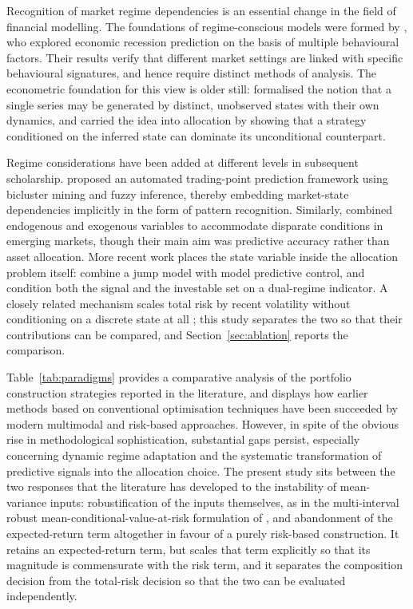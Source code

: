 \documentclass{singlecol-new}
\theoremstyle{TH}{
\newtheorem{lemma}{Lemma}
\newtheorem{theorem}[lemma]{Theorem}
\newtheorem{corrolary}[lemma]{Corrolary}
\newtheorem{conjecture}[lemma]{Conjecture}
\newtheorem{proposition}[lemma]{Proposition}
\newtheorem{claim}[lemma]{Claim}
\newtheorem{stheorem}[lemma]{Wrong Theorem}
\newtheorem{algorithm}{Algorithm}
}
\theoremstyle{THrm}{
\newtheorem{definition}{Definition}[section]
\newtheorem{question}{Question}[section]
\newtheorem{remark}{Remark}
\newtheorem{scheme}{Scheme}
}
\theoremstyle{THhit}{
\newtheorem{case}{Case}[section]
}
\begin{document}
Recognition of market regime dependencies is an essential change in the field of
financial modelling. The foundations of regime-conscious models were formed by
\citet{wang19}, who explored economic recession prediction on the basis of multiple
behavioural factors. Their results verify that different market settings are linked with
specific behavioural signatures, and hence require distinct methods of analysis. The
econometric foundation for this view is older still: \citet{hamilton89} formalised the
notion that a single series may be generated by distinct, unobserved states with their
own dynamics, and \citet{kritzman12} carried the idea into allocation by showing that a
strategy conditioned on the inferred state can dominate its unconditional counterpart.

Regime considerations have been added at different levels in subsequent scholarship.
\citet{huang20} proposed an automated trading-point prediction framework using bicluster
mining and fuzzy inference, thereby embedding market-state dependencies implicitly in the
form of pattern recognition. Similarly, \citet{alsheebah24} combined endogenous and
exogenous variables to accommodate disparate conditions in emerging markets, though their
main aim was predictive accuracy rather than asset allocation. More recent work places
the state variable inside the allocation problem itself: \citet{li25} combine a jump model
with model predictive control, and \citet{luo26} condition both the signal and the
investable set on a dual-regime indicator. A closely related mechanism scales total risk
by recent volatility without conditioning on a discrete state at all
\citep{moreira17,hood25}; this study separates the two so that their contributions can be
compared, and Section~\ref{sec:ablation} reports the comparison.

Table~\ref{tab:paradigms} provides a comparative analysis of the portfolio construction
strategies reported in the literature, and displays how earlier methods based on
conventional optimisation techniques have been succeeded by modern multimodal and
risk-based approaches. However, in spite of the obvious rise in methodological
sophistication, substantial gaps persist, especially concerning dynamic regime adaptation
and the systematic transformation of predictive signals into the allocation choice. The
present study sits between the two responses that the literature has developed to the
instability of mean-variance inputs: robustification of the inputs themselves, as in the
multi-interval robust mean-conditional-value-at-risk formulation of
\citet{khodamoradi23}, and abandonment of the expected-return term altogether in favour
of a purely risk-based construction. It retains an expected-return term, but scales that
term explicitly so that its magnitude is commensurate with the risk term, and it separates
the composition decision from the total-risk decision so that the two can be evaluated
independently.
\end{document}
